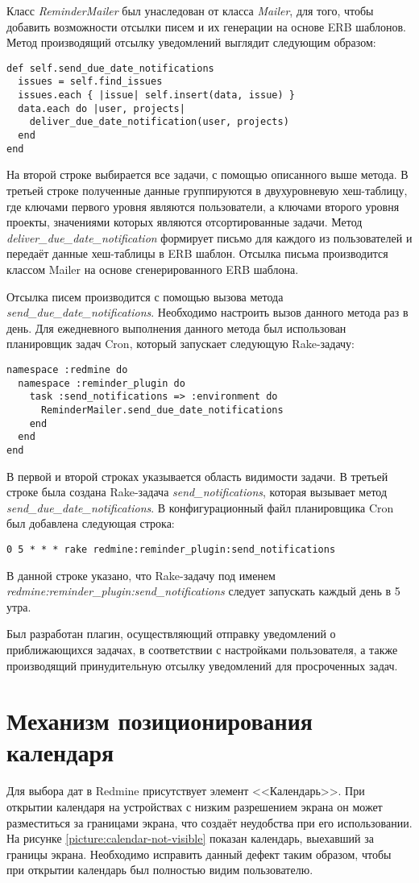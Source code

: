 Класс \textit{ReminderMailer} был унаследован от класса \textit{Mailer}, для
того, чтобы добавить возможности отсылки писем и их генерации на основе ERB
шаблонов. Метод производящий отсылку уведомлений выглядит следующим образом:
\small{\begin{lstlisting}
def self.send_due_date_notifications
  issues = self.find_issues
  issues.each { |issue| self.insert(data, issue) }
  data.each do |user, projects|
    deliver_due_date_notification(user, projects)
  end
end
\end{lstlisting}}
На второй строке выбирается все задачи, с помощью описанного выше метода. В
третьей строке полученные данные группируются в двухуровневую хеш-таблицу, где
ключами первого уровня являются пользователи, а ключами второго уровня проекты,
значениями которых являются отсортированные задачи. Метод
\textit{deliver\_due\_date\_notification} формирует письмо для каждого из
пользователей и передаёт данные хеш-таблицы в ERB шаблон. Отсылка письма
производится классом Mailer на основе сгенерированного ERB шаблона.

Отсылка писем производится с помощью вызова метода
\textit{send\_due\_date\_notifications}. Необходимо настроить
вызов данного метода раз в день. Для ежедневного выполнения данного метода был
использован планировщик задач Cron, который запускает следующую Rake-задачу:
\small{\begin{lstlisting}
namespace :redmine do
  namespace :reminder_plugin do
    task :send_notifications => :environment do
      ReminderMailer.send_due_date_notifications
    end
  end
end
\end{lstlisting}}
В первой и второй строках указывается область видимости задачи. В третьей
строке была создана Rake-задача \textit{send\_notifications}, которая вызывает
метод \textit{send\_due\_date\_notifications}. В конфигурационный файл
планировщика Cron был добавлена следующая строка:
\small{\begin{lstlisting}
0 5 * * * rake redmine:reminder_plugin:send_notifications
\end{lstlisting}}
В данной строке указано, что Rake-задачу под именем
\textit{redmine:\-reminder\_plugin:\-send\_notifications} следует
запускать каждый день в 5 утра.

Был разработан плагин, осуществляющий отправку уведомлений о приближающихся
задачах, в соответствии с настройками пользователя, а также производящий
принудительную отсылку уведомлений для просроченных задач.

\section{Механизм позиционирования календаря}
Для выбора дат в Redmine присутствует элемент <<Календарь>>. При открытии
календаря на устройствах с низким разрешением экрана он может разместиться за
границами экрана, что создаёт неудобства при его использовании. На рисунке
\ref{picture:calendar-not-visible} показан календарь, выехавший за границы
экрана. Необходимо исправить данный дефект таким образом, чтобы при открытии
календарь был полностью видим пользователю.

